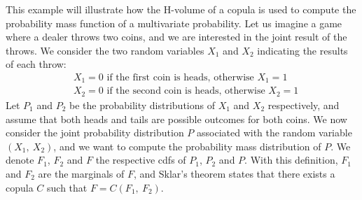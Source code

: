 \begin{example}\label{ex:hvolume}
    This example will illustrate how the H-volume of a copula is used to compute the probability mass function of a multivariate probability. Let us imagine a game where a dealer throws two coins, and we are interested in the joint result of the throws. We consider the two random variables $X_1$ and $X_2$ indicating the results of each throw:
    \begin{align*}
        &X_1=0\text{ if the first coin is heads, otherwise }X_1=1\\
        &X_2=0\text{ if the second coin is heads, otherwise }X_2=1
    \end{align*}
    Let $P_1$ and $P_2$ be the probability distributions of $X_1$ and $X_2$ respectively, and assume that both heads and tails are possible outcomes for both coins. We now consider the joint probability distribution $P$ associated with the random variable $(X_1,~X_2)$, and we want to compute the probability mass distribution of $P$. We denote $F_1$, $F_2$ and $F$ the respective \acrshort{cdf}s of $P_1$, $P_2$ and $P$. With this definition, $F_1$ and $F_2$ are the marginals of $F$, and Sklar's theorem states that there exists a copula $C$ such that $F=C(F_1,~F_2)$. 
    

\end{example}

